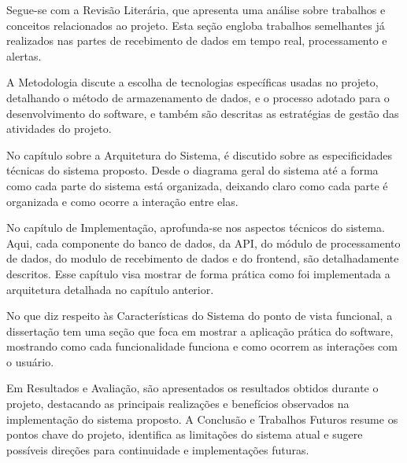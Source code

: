 Segue-se com a Revisão Literária, que apresenta uma análise sobre trabalhos e conceitos relacionados ao projeto. Esta seção engloba trabalhos semelhantes já realizados nas partes de recebimento de dados em tempo real, processamento e alertas.

A Metodologia discute a escolha de tecnologias específicas usadas no projeto, detalhando o método de armazenamento de dados, e o processo adotado para o desenvolvimento do software, e também são descritas as estratégias de gestão das atividades do projeto.

No capítulo sobre a Arquitetura do Sistema, é discutido sobre as especificidades técnicas do sistema proposto. Desde o diagrama geral do sistema até a forma como cada parte do sistema está organizada, deixando claro como cada parte é organizada e como ocorre a interação entre elas.

No capítulo de Implementação, aprofunda-se nos aspectos técnicos do sistema. Aqui, cada componente do banco de dados, da API, do módulo de processamento de dados, do modulo de recebimento de dados e do frontend, são detalhadamente descritos. Esse capítulo visa mostrar de forma prática como foi implementada a arquitetura detalhada no capítulo anterior.

No que diz respeito às Características do Sistema do ponto de vista funcional, a dissertação tem uma seção que foca em mostrar a aplicação prática do software, mostrando como cada funcionalidade funciona e como ocorrem as interações com o usuário.

Em Resultados e Avaliação, são apresentados os resultados obtidos durante o projeto, destacando as principais realizações e benefícios observados na implementação do sistema proposto. A Conclusão e Trabalhos Futuros resume os pontos chave do projeto, identifica as limitações do sistema atual e sugere possíveis direções para continuidade e implementações futuras.




